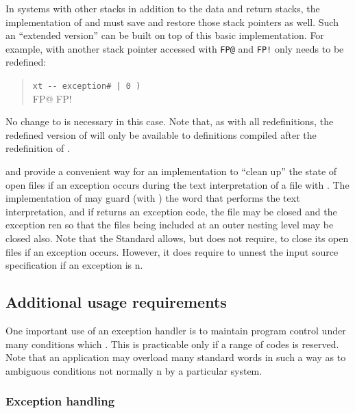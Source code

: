 In systems with other stacks in addition to the data and return stacks,
the implementation of  and  must save and
restore those stack pointers as well. Such an ``extended version'' can
be built on top of this basic implementation. For example, with another
stack pointer accessed with \texttt{FP@} and \texttt{FP!} only
 needs to be redefined:

\begin{quote}\ttfamily
	\word{:} 
		 \texttt{xt -{}- exception\# | 0 )} \\
	\tab FP@   
		  FP!   
	\word{;}
\end{quote}

No change to  is necessary in this case. Note that, as
with all redefinitions, the redefined version of  will
only be available to definitions compiled after the redefinition of
.

 and  provide a convenient way for an
implementation to ``clean up'' the state of open files if an
exception occurs during the text interpretation of a file with
. The implementation of
 may guard (with ) the word
that performs the text interpretation, and if  returns
an exception code, the file may be closed and the exception
ren so that the files being included at an outer nesting
level may be closed also. Note that the Standard allows, but does not
require,  to close its open files if an
exception occurs. However, it does require 
to unnest the input source specification if an exception is
n.

\setcounter{subsection}{2}
\subsection{Additional usage requirements} %

One important use of an exception handler is to maintain program
control under many conditions which .  This is practicable
only if a range of codes is reserved.  Note that an application may
overload many standard words in such a way as to 
ambiguous conditions not normally n by a particular
system.

\setcounter{subsubsection}{5}
\subsubsection{Exception handling} %

